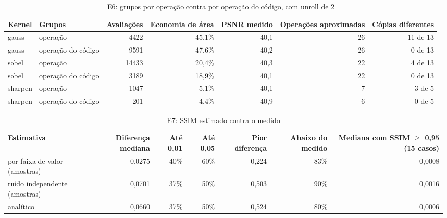 \begin{table}[htbp]
\centering
\caption{E6: grupos por operação contra por operação do código, com unroll de 2}
\begin{tabular}{|l|l|r|r|r|r|r|}
\hline
\rowcolor{tabAzul}\color{white}Kernel & \color{white}Grupos & \color{white}Avaliações & \color{white}Economia de área & \color{white}PSNR medido & \color{white}Operações aproximadas & \color{white}Cópias diferentes \\
\hline
gauss & operação & 4422 & 45,1\% & 40,1 & 26 & 11 de 13 \\ \hline
gauss & operação do código & 9591 & 47,6\% & 40,2 & 26 & 0 de 13 \\ \hline
sobel & operação & 14433 & 20,4\% & 40,3 & 22 & 4 de 13 \\ \hline
sobel & operação do código & 3189 & 18,9\% & 40,1 & 22 & 0 de 13 \\ \hline
sharpen & operação & 1047 & 5,1\% & 40,1 & 7 & 3 de 5 \\ \hline
sharpen & operação do código & 201 & 4,4\% & 40,9 & 6 & 0 de 5 \\ \hline
\end{tabular}
\end{table}

\begin{table}[htbp]
\centering
\caption{E7: SSIM estimado contra o medido}
\begin{tabular}{|l|r|r|r|r|r|r|}
\hline
\rowcolor{tabAzul}\color{white}Estimativa & \color{white}Diferença mediana & \color{white}Até 0,01 & \color{white}Até 0,05 & \color{white}Pior diferença & \color{white}Abaixo do medido & \color{white}Mediana com SSIM $\geq$ 0,95 (15 casos) \\
\hline
por faixa de valor (amostras) & 0,0275 & 40\% & 60\% & 0,224 & 83\% & 0,0008 \\ \hline
ruído independente (amostras) & 0,0701 & 37\% & 50\% & 0,503 & 90\% & 0,0016 \\ \hline
analítico & 0,0660 & 37\% & 50\% & 0,524 & 80\% & 0,0006 \\ \hline
\end{tabular}
\end{table}


